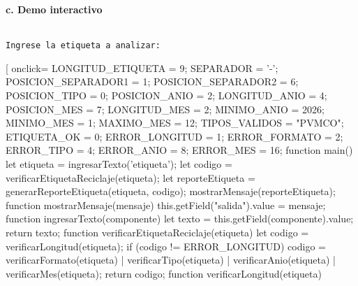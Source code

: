 \documentclass{article}
\begin{document}
\vspace{0.5cm}
\textbf{c. Demo interactivo}\\
\\

{\footnotesize
  \begin{Form}
    \texttt{Ingrese la etiqueta a analizar: }
    \TextField[name=etiqueta,width=4cm]{}
    \vspace{0.2cm}

    \TextField[name=salida,width=10cm,height=2.8cm,multiline=true,readonly=true]{}
    \end{Form}
    
    \vspace{0.2cm} 
     
    \begin{Form}
    \PushButton[%
    onclick={
            LONGITUD_ETIQUETA = 9;
            SEPARADOR = '-';
            POSICION_SEPARADOR1 = 1;
            POSICION_SEPARADOR2 = 6;
            POSICION_TIPO = 0;
            POSICION_ANIO = 2;
            LONGITUD_ANIO = 4;
            POSICION_MES = 7;
            LONGITUD_MES = 2;
            MINIMO_ANIO = 2026;
            MINIMO_MES = 1;
            MAXIMO_MES = 12;
            TIPOS_VALIDOS = "PVMCO";
            ETIQUETA_OK = 0;
            ERROR_LONGITUD = 1;
            ERROR_FORMATO = 2;
            ERROR_TIPO = 4;
            ERROR_ANIO = 8;
            ERROR_MES = 16;
            function main() {
                let etiqueta = ingresarTexto('etiqueta');
                let codigo = verificarEtiquetaReciclaje(etiqueta);
                let reporteEtiqueta = generarReporteEtiqueta(etiqueta, codigo);
                mostrarMensaje(reporteEtiqueta);
            }
            function mostrarMensaje(mensaje) {
                this.getField("salida").value = mensaje;
            }
            function ingresarTexto(componente) {
                let texto = this.getField(componente).value;
                return texto;
            }
            function verificarEtiquetaReciclaje(etiqueta) {
                let codigo = verificarLongitud(etiqueta);
                if (codigo != ERROR_LONGITUD) {
                    codigo  = verificarFormato(etiqueta) |
                              verificarTipo(etiqueta)    |
                              verificarAnio(etiqueta)    |
                              verificarMes(etiqueta);
                }
                return codigo;
            }
            function verificarLongitud(etiqueta) {
}}
\end{Form}}
\end{document}
